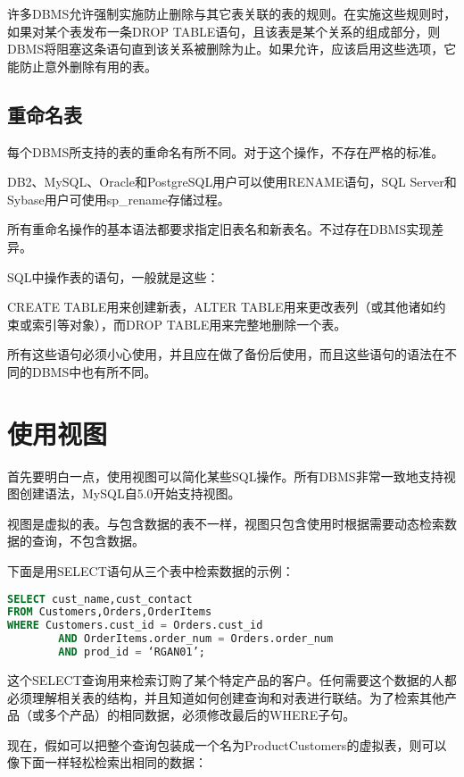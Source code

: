 许多DBMS允许强制实施防止删除与其它表关联的表的规则。在实施这些规则时，如果对某个表发布一条DROP TABLE语句，且该表是某个关系的组成部分，则DBMS将阻塞这条语句直到该关系被删除为止。如果允许，应该启用这些选项，它能防止意外删除有用的表。


\subsection{重命名表}

每个DBMS所支持的表的重命名有所不同。对于这个操作，不存在严格的标准。

DB2、MySQL、Oracle和PostgreSQL用户可以使用RENAME语句，SQL Server和Sybase用户可使用sp\_rename存储过程。

所有重命名操作的基本语法都要求指定旧表名和新表名。不过存在DBMS实现差异。

SQL中操作表的语句，一般就是这些：

\begin{compactitem}
\item CREATE TABLE用来创建新表，ALTER TABLE用来更改表列（或其他诸如约束或索引等对象），而DROP TABLE用来完整地删除一个表。
\item 所有这些语句必须小心使用，并且应在做了备份后使用，而且这些语句的语法在不同的DBMS中也有所不同。
\end{compactitem}


\section{使用视图}

首先要明白一点，使用视图可以简化某些SQL操作。所有DBMS非常一致地支持视图创建语法，MySQL自5.0开始支持视图。

视图是虚拟的表。与包含数据的表不一样，视图只包含使用时根据需要动态检索数据的查询，不包含数据。

下面是用SELECT语句从三个表中检索数据的示例：

\begin{lstlisting}[language=SQL]
SELECT cust_name,cust_contact
FROM Customers,Orders,OrderItems
WHERE Customers.cust_id = Orders.cust_id
		AND OrderItems.order_num = Orders.order_num
		AND prod_id = ‘RGAN01’;
\end{lstlisting}

这个SELECT查询用来检索订购了某个特定产品的客户。任何需要这个数据的人都必须理解相关表的结构，并且知道如何创建查询和对表进行联结。为了检索其他产品（或多个产品）的相同数据，必须修改最后的WHERE子句。

现在，假如可以把整个查询包装成一个名为ProductCustomers的虚拟表，则可以像下面一样轻松检索出相同的数据：

